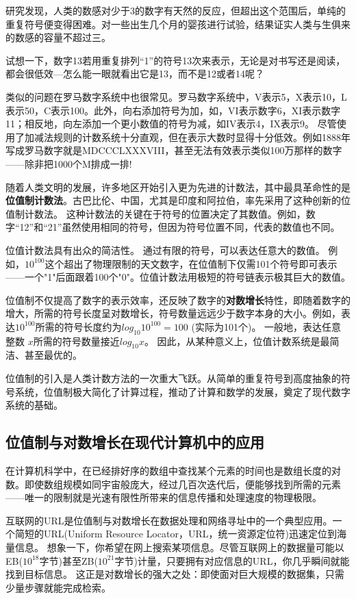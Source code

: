 研究发现，人类的数感对少于3的数字有天然的反应，但超出这个范围后，单纯的重复符号便变得困难。对一些出生几个月的婴孩进行试验，结果证实人类与生俱来的数感的容量不超过三。

试想一下，数字13若用重复排列“1”的符号13次来表示，无论是对书写还是阅读，都会很低效---怎么能一眼就看出它是13，而不是12或者14呢？

类似的问题在罗马数字系统中也很常见。罗马数字系统中，V表示5，X表示10，L表示50，C表示100。此外，向右添加符号为加，如，VI表示数字6，XI表示数字11；相反地，向左添加一个更小数值的符号为减，如IV表示4，IX表示9。
尽管使用了加减法规则的计数系统十分直观，但在表示大数时显得十分低效。例如1888年写成罗马数字就是MDCCCLXXXVIII，甚至无法有效表示类似100万那样的数字——除非把1000个M排成一排!

随着人类文明的发展，许多地区开始引入更为先进的计数法，其中最具革命性的是{\bf 位值制计数法}。古巴比伦、中国，尤其是印度和阿拉伯，率先采用了这种创新的位值制计数法。
这种计数法的关键在于符号的位置决定了其数值。例如，数字“12”和“21”虽然使用相同的符号，但因为符号位置不同，代表的数值也不同。

位值计数法具有出众的简洁性。
通过有限的符号，可以表达任意大的数值。
例如，$10^{100}$这个超出了物理限制的天文数字，在位值制下仅需101个符号即可表示——一个"1"后面跟着100个"0"。位值计数法用极短的符号链表示极其巨大的数值。

位值制不仅提高了数字的表示效率，还反映了数字的{\bf 对数增长}特性，即随着数字的增大，所需的符号长度呈对数增长，符号数量远远少于数字本身的大小。例如，表达$10^{100}$所需的符号长度约为$log_10 10^{100}=100$ (实际为101个)。
一般地，表达任意整数 $x$所需的符号数量接近$log_{10} x$。
因此，从某种意义上，位值计数系统是最简洁、甚至最优的。

位值制的引入是人类计数方法的一次重大飞跃。从简单的重复符号到高度抽象的符号系统，位值制极大简化了计算过程，推动了计算和数学的发展，奠定了现代数字系统的基础。

\subsection{位值制与对数增长在现代计算机中的应用}
在计算机科学中，在已经排好序的数组中查找某个元素的时间也是数组长度的对数。即使数组规模如同宇宙般庞大，经过几百次迭代后，便能够找到所需的元素——唯一的限制就是光速有限性所带来的信息传播和处理速度的物理极限。

互联网的URL是位值制与对数增长在数据处理和网络寻址中的一个典型应用。一个简短的URL(Uniform Resource Locator，URL，统一资源定位符)迅速定位到海量信息。
想象一下，你希望在网上搜索某项信息。尽管互联网上的数据量可能以EB($10^{18}$字节)甚至ZB($10^{21}$字节)计量，只要拥有对应信息的URL，你几乎瞬间就能找到目标信息。
这正是对数增长的强大之处：即使面对巨大规模的数据集，只需少量步骤就能完成检索。

